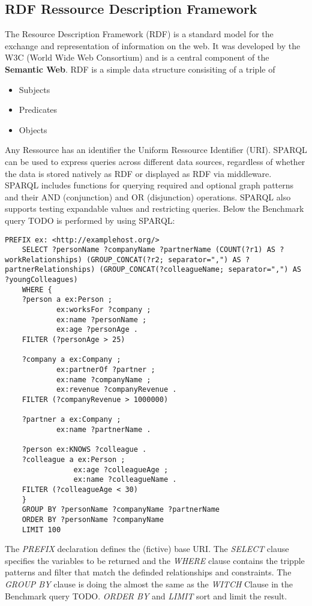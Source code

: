 \subsection{RDF Ressource Description Framework}
The Resource Description Framework (RDF) is a standard model 
for the exchange and representation of information on the web. 
It was developed by the W3C (World Wide Web Consortium) and is a central component 
of the \textbf{Semantic Web}.
RDF is a simple data structure consisiting of a triple of
\begin{itemize}
	\item Subjects
	\item Predicates 
	\item Objects 
\end{itemize}
Any Ressource has an identifier the Uniform Ressource Identifier (URI).
SPARQL can be used to express queries across different data sources, 
regardless of whether the data is stored natively as RDF or displayed as RDF via middleware. 
SPARQL includes functions for querying required and optional graph patterns 
and their AND (conjunction) and OR (disjunction) operations. 
SPARQL also supports testing expandable values and restricting queries.
Below the Benchmark query TODO is performed by using SPARQL:
\begin{lstlisting}[caption={Benchmark query in SPARQL}, label={lst:benchmarkSPQARQL}]
	PREFIX ex: <http://examplehost.org/>
	SELECT ?personName ?companyName ?partnerName (COUNT(?r1) AS ?workRelationships) (GROUP_CONCAT(?r2; separator=",") AS ?partnerRelationships) (GROUP_CONCAT(?colleagueName; separator=",") AS ?youngColleagues)
	WHERE {
	?person a ex:Person ;
			ex:worksFor ?company ;
			ex:name ?personName ;
			ex:age ?personAge .
	FILTER (?personAge > 25)

	?company a ex:Company ;
			ex:partnerOf ?partner ;
			ex:name ?companyName ;
			ex:revenue ?companyRevenue .
	FILTER (?companyRevenue > 1000000)

	?partner a ex:Company ;
			ex:name ?partnerName .
	
	?person ex:KNOWS ?colleague .
	?colleague a ex:Person ;
				ex:age ?colleagueAge ;
				ex:name ?colleagueName .
	FILTER (?colleagueAge < 30)
	}
	GROUP BY ?personName ?companyName ?partnerName
	ORDER BY ?personName ?companyName
	LIMIT 100
\end{lstlisting}
The \textit{PREFIX} declaration defines the (fictive) base URI.
The \textit{SELECT} clause specifies the variables to be returned and the
\textit{WHERE} clause contains the tripple patterns and filter that match 
the definded relationships and constraints.
The \textit{GROUP BY} clause is doing the almost the same as the \textit{WITCH} Clause in 
the Benchmark query TODO.
\textit{ORDER BY} and \textit{LIMIT} sort and limit the result.
 
